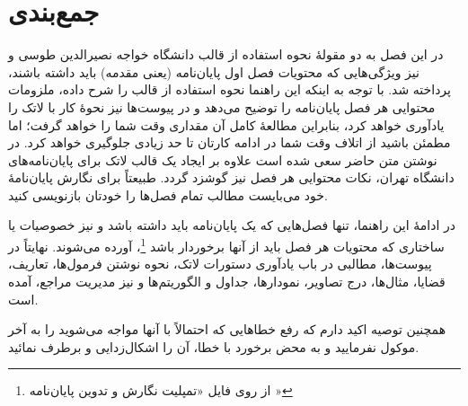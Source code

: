 \section{جمع‌بندی}
در این فصل به دو مقولهٔ نحوه استفاده از قالب \پ دانشگاه خواجه نصیرالدین طوسی و نیز ویژگی‌هایی که محتویات فصل اول پایان‌نامه (یعنی مقدمه) باید داشته باشند، پرداخته شد. با توجه به اینکه این راهنما نحوه استفاده از قالب را شرح داده، ملزومات محتوایی هر فصل پایان‌نامه را توضیح می‌دهد و در پیوست‌ها نیز نحوهٔ کار با لاتک را یادآوری خواهد کرد، بنابراین مطالعهٔ کامل آن مقداری وقت شما را خواهد گرفت؛ اما مطمئن باشید از اتلاف وقت شما در ادامه کارتان تا حد زیادی جلوگیری خواهد کرد. در نوشتن متن حاضر سعی شده است علاوه بر ایجاد یک قالب لاتک برای پایان‌نامه‌های دانشگاه تهران، نکات محتوایی هر فصل نیز گوشزد گردد. طبیعتاً برای نگارش پایان‌نامهٔ خود می‌بایست مطالب تمام فصل‌ها را خودتان بازنویسی کنید.

در ادامهٔ این راهنما، تنها فصل‌هایی که یک پایان‌نامه باید داشته باشد و نیز خصوصیات یا ساختاری که محتویات هر فصل باید از آنها برخوردار باشد%
\footnote{از روی فایل «تمپلیت نگارش و تدوین پایان‌نامه \cite{UTThesisGuide}»}،
آورده می‌شوند. نهایتاً  در پیوست‌ها، مطالبی در باب یادآوری دستورات لاتک، نحوه نوشتن فرمول‌ها، تعاریف، قضایا، مثال‌ها، درج تصاویر، نمودارها، جداول و الگوریتم‌ها و نیز مدیریت مراجع، آمده است.

همچنین توصیه اکید دارم که رفع خطاهایی که احتمالاً با آنها مواجه می‌شوید را به آخر موکول نفرمایید و به محض برخورد با خطا، آن را اشکال‌زدایی و برطرف نمائید.
